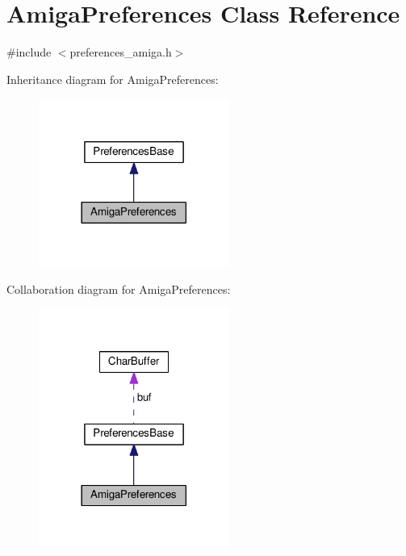 \hypertarget{classAmigaPreferences}{}\section{Amiga\+Preferences Class Reference}
\label{classAmigaPreferences}


{\ttfamily \#include $<$preferences\+\_\+amiga.\+h$>$}



Inheritance diagram for Amiga\+Preferences\+:
\nopagebreak
\begin{figure}[H]
\begin{center}
\leavevmode
\includegraphics[width=177pt]{da/de8/classAmigaPreferences__inherit__graph}
\end{center}
\end{figure}


Collaboration diagram for Amiga\+Preferences\+:
\nopagebreak
\begin{figure}[H]
\begin{center}
\leavevmode
\includegraphics[width=177pt]{d7/d9a/classAmigaPreferences__coll__graph}
\end{center}
\end{figure}
